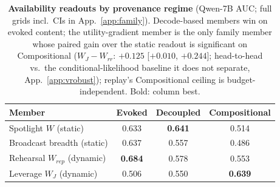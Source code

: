 \begin{table}[t]
\centering
\caption{\textbf{Availability readouts by provenance regime} (Qwen-7B AUC; full grids
incl.\ CIs in App.~\ref{app:family}). Decode-based members win on evoked content;
the utility-gradient member is the only family member whose paired gain over
the static readout is significant on Compositional
($W_J{-}W_{rr}$: $+0.125$ [$+0.010$, $+0.244$]; head-to-head vs.\ the
conditional-likelihood baseline it does not separate, App.~\ref{app:vrobust});
replay's Compositional ceiling is budget-independent. Bold: column best.}
\label{tab:family}
\small
\begin{tabular}{lccc}
\toprule
Member & Evoked & Decoupled & Compositional \\
\midrule
Spotlight $W$ (static) & 0.633 & \textbf{0.641} & 0.514 \\
Broadcast breadth (static) & 0.637 & 0.557 & 0.486 \\
Rehearsal $W_{rep}$ (dynamic) & \textbf{0.684} & 0.578 & 0.553 \\
Leverage $W_{J}$ (dynamic) & 0.506 & 0.550 & \textbf{0.639} \\
\bottomrule
\end{tabular}
\end{table}
